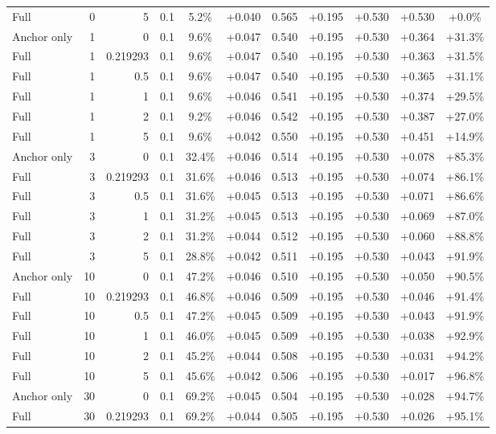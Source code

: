 \begin{table}[htbp]
\begin{tabular}{lrrrccccccc}
Full & 0 & 5 & 0.1 & 5.2\% & +0.040 & 0.565 & +0.195 & +0.530 & +0.530 & +0.0\% \\
Anchor only & 1 & 0 & 0.1 & 9.6\% & +0.047 & 0.540 & +0.195 & +0.530 & +0.364 & +31.3\% \\
Full & 1 & 0.219293 & 0.1 & 9.6\% & +0.047 & 0.540 & +0.195 & +0.530 & +0.363 & +31.5\% \\
Full & 1 & 0.5 & 0.1 & 9.6\% & +0.047 & 0.540 & +0.195 & +0.530 & +0.365 & +31.1\% \\
Full & 1 & 1 & 0.1 & 9.6\% & +0.046 & 0.541 & +0.195 & +0.530 & +0.374 & +29.5\% \\
Full & 1 & 2 & 0.1 & 9.2\% & +0.046 & 0.542 & +0.195 & +0.530 & +0.387 & +27.0\% \\
Full & 1 & 5 & 0.1 & 9.6\% & +0.042 & 0.550 & +0.195 & +0.530 & +0.451 & +14.9\% \\
Anchor only & 3 & 0 & 0.1 & 32.4\% & +0.046 & 0.514 & +0.195 & +0.530 & +0.078 & +85.3\% \\
Full & 3 & 0.219293 & 0.1 & 31.6\% & +0.046 & 0.513 & +0.195 & +0.530 & +0.074 & +86.1\% \\
Full & 3 & 0.5 & 0.1 & 31.6\% & +0.045 & 0.513 & +0.195 & +0.530 & +0.071 & +86.6\% \\
Full & 3 & 1 & 0.1 & 31.2\% & +0.045 & 0.513 & +0.195 & +0.530 & +0.069 & +87.0\% \\
Full & 3 & 2 & 0.1 & 31.2\% & +0.044 & 0.512 & +0.195 & +0.530 & +0.060 & +88.8\% \\
Full & 3 & 5 & 0.1 & 28.8\% & +0.042 & 0.511 & +0.195 & +0.530 & +0.043 & +91.9\% \\
Anchor only & 10 & 0 & 0.1 & 47.2\% & +0.046 & 0.510 & +0.195 & +0.530 & +0.050 & +90.5\% \\
Full & 10 & 0.219293 & 0.1 & 46.8\% & +0.046 & 0.509 & +0.195 & +0.530 & +0.046 & +91.4\% \\
Full & 10 & 0.5 & 0.1 & 47.2\% & +0.045 & 0.509 & +0.195 & +0.530 & +0.043 & +91.9\% \\
Full & 10 & 1 & 0.1 & 46.0\% & +0.045 & 0.509 & +0.195 & +0.530 & +0.038 & +92.9\% \\
Full & 10 & 2 & 0.1 & 45.2\% & +0.044 & 0.508 & +0.195 & +0.530 & +0.031 & +94.2\% \\
Full & 10 & 5 & 0.1 & 45.6\% & +0.042 & 0.506 & +0.195 & +0.530 & +0.017 & +96.8\% \\
Anchor only & 30 & 0 & 0.1 & 69.2\% & +0.045 & 0.504 & +0.195 & +0.530 & +0.028 & +94.7\% \\
Full & 30 & 0.219293 & 0.1 & 69.2\% & +0.044 & 0.505 & +0.195 & +0.530 & +0.026 & +95.1\% \\

\end{tabular}
\end{table}
